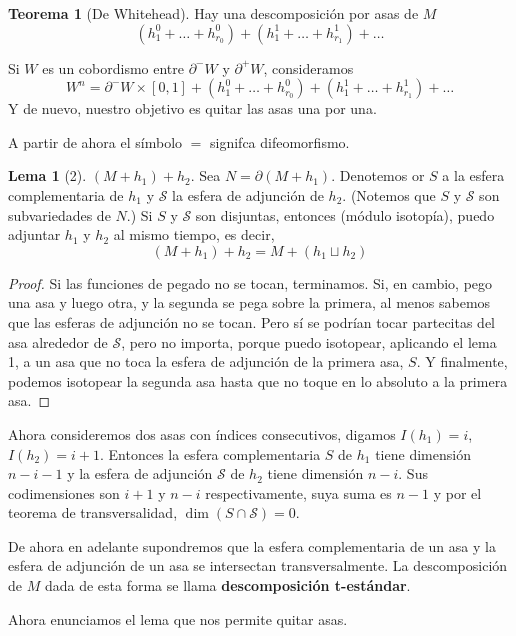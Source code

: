 \documentclass[spanish]{book}
\theoremstyle{definition}
\newtheorem*{lema}{Lema}
\newtheorem*{teo}{Teorema}
\begin{document}
\begin{teo}[De Whitehead]
	Hay una descomposición por asas de $M$
	\[(h^0_1+\ldots+h_{r_0}^0)+(h^1_1+\ldots +h^1_{r_1})+\ldots\]
\end{teo}
Si $W$ es un cobordismo entre $\partial^-W$ y $\partial^+W$, consideramos
	\[W^n=\partial^-W\times [0,1]+(h^0_1+\ldots+h_{r_0}^0)+(h^1_1+\ldots +h^1_{r_1})+\ldots\]
Y de nuevo, nuestro objetivo es quitar las asas una por una.

A partir de ahora el símbolo $=$ signifca difeomorfismo.
\begin{lema}[2]
	$(M+h_1)+h_2$. Sea $N=\partial(M+h_1)$. Denotemos or $S$ a la esfera complementaria de $h_1$ y $\mathcal{S}$ la esfera de adjunción de $h_2$. (Notemos que  $S$ y $\mathcal{S}$ son subvariedades de $N$.) Si $S$ y $\mathcal{S}$ son disjuntas, entonces (módulo isotopía), puedo adjuntar $h_1$ y $h_2$ al mismo tiempo, es decir,
	\[(M+h_1)+h_2=M+(h_1\sqcup h_2)\]
\end{lema}
\begin{proof}
	Si las funciones de pegado no se tocan, terminamos. Si, en cambio, pego una asa y luego otra, y la segunda se pega sobre la primera, al menos sabemos que las esferas de adjunción no se tocan. Pero sí se podrían tocar partecitas del asa alrededor de $\mathcal{S}$, pero no importa, porque puedo isotopear, aplicando el lema 1, a un asa que no toca la esfera de adjunción de la primera asa, $S$. Y finalmente, podemos isotopear la segunda asa hasta que no toque en lo absoluto a la primera asa.
\end{proof}

Ahora consideremos dos asas con índices consecutivos, digamos $I(h_1)=i$, $I(h_2)=i+1$. Entonces la esfera complementaria $S$ de $h_1$ tiene dimensión $n-i-1$ y la esfera de adjunción $\mathcal{S}$ de $h_2$ tiene dimensión $n-i$. Sus codimensiones son $i+1$ y $n-i$ respectivamente, suya suma es $n-1$ y por el teorema de transversalidad, $\dim(S\cap \mathcal{S})=0$.

De ahora en adelante supondremos que la esfera complementaria de un asa y la esfera de adjunción de un asa se intersectan transversalmente. La descomposición de $M$ dada de esta forma se llama \textbf{descomposición t-estándar}.

Ahora enunciamos el lema que nos permite quitar asas.
\end{document}
